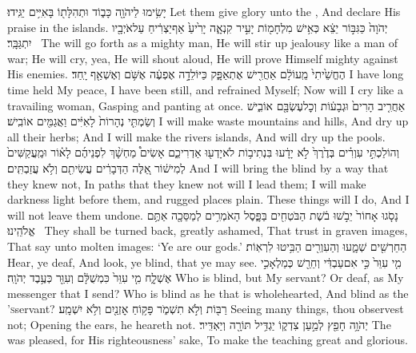 {יָשִׂ֥ימוּ לַיהֹוָ֖ה כָּב֑וֹד וּתְהִלָּת֖וֹ בָּאִיִּ֥ים יַגִּֽידוּ׃}
{Let them give glory unto the \lord, And declare His praise in the islands.}
{יְהֹוָה֙ כַּגִּבּ֣וֹר יֵצֵ֔א כְּאִ֥ישׁ מִלְחָמ֖וֹת יָעִ֣יר קִנְאָ֑ה יָרִ֙יעַ֙ אַף\maqqaf יַצְרִ֔יחַ עַל\maqqaf אֹיְבָ֖יו יִתְגַּבָּֽר׃ \setuma }
{The \lord\space will go forth as a mighty man, He will stir up jealousy like a man of war; He will cry, yea, He will shout aloud, He will prove Himself mighty against His enemies.}
{הֶחֱשֵׁ֙יתִי֙ מֵֽעוֹלָ֔ם אַחֲרִ֖ישׁ אֶתְאַפָּ֑ק כַּיּוֹלֵדָ֣ה אֶפְעֶ֔ה אֶשֹּׁ֥ם וְאֶשְׁאַ֖ף יָֽחַד׃}
{I have long time held My peace, I have been still, and refrained Myself; Now will I cry like a travailing woman, Gasping and panting at once.}
{אַחֲרִ֤יב הָרִים֙ וּגְבָע֔וֹת וְכׇל\maqqaf עֶשְׂבָּ֖ם אוֹבִ֑ישׁ וְשַׂמְתִּ֤י נְהָרוֹת֙ לָאִיִּ֔ים וַאֲגַמִּ֖ים אוֹבִֽישׁ׃}
{I will make waste mountains and hills, And dry up all their herbs; And I will make the rivers islands, And will dry up the pools.}
{וְהוֹלַכְתִּ֣י עִוְרִ֗ים בְּדֶ֙רֶךְ֙ לֹ֣א יָדָ֔עוּ בִּנְתִיב֥וֹת לֹא\maqqaf יָדְע֖וּ אַדְרִיכֵ֑ם אָשִׂים֩ מַחְשָׁ֨ךְ לִפְנֵיהֶ֜ם לָא֗וֹר וּמַֽעֲקַשִּׁים֙ לְמִישׁ֔וֹר אֵ֚לֶּה הַדְּבָרִ֔ים עֲשִׂיתִ֖ם וְלֹ֥א עֲזַבְתִּֽים׃}
{And I will bring the blind by a way that they knew not, In paths that they knew not will I lead them; I will make darkness light before them, and rugged places plain. These things will I do, And I will not leave them undone.}
{נָסֹ֤גוּ אָחוֹר֙ יֵבֹ֣שׁוּ בֹ֔שֶׁת הַבֹּטְחִ֖ים בַּפָּ֑סֶל הָאֹמְרִ֥ים לְמַסֵּכָ֖ה אַתֶּ֥ם אֱלֹהֵֽינוּ׃ \petucha }
{They shall be turned back, greatly ashamed, That trust in graven images, That say unto molten images: ‘Ye are our gods.’}
{הַחֵרְשִׁ֖ים שְׁמָ֑עוּ וְהַעִוְרִ֖ים הַבִּ֥יטוּ לִרְאֽוֹת׃}
{Hear, ye deaf, And look, ye blind, that ye may see.}
{מִ֤י עִוֵּר֙ כִּ֣י אִם\maqqaf עַבְדִּ֔י וְחֵרֵ֖שׁ כְּמַלְאָכִ֣י אֶשְׁלָ֑ח מִ֤י עִוֵּר֙ כִּמְשֻׁלָּ֔ם וְעִוֵּ֖ר כְּעֶ֥בֶד יְהֹוָֽה׃}
{Who is blind, but My servant? Or deaf, as My messenger that I send? Who is blind as he that is wholehearted, And blind as the \lord\textsc{’s}\space servant?}
{ רַבּ֖וֹת וְלֹ֣א תִשְׁמֹ֑ר פָּק֥וֹחַ אׇזְנַ֖יִם וְלֹ֥א יִשְׁמָֽע׃}
{Seeing many things, thou observest not; Opening the ears, he heareth not.}
{יְהֹוָ֥ה חָפֵ֖ץ לְמַ֣עַן צִדְק֑וֹ יַגְדִּ֥יל תּוֹרָ֖ה וְיַאְדִּֽיר׃}
{The \lord\space was pleased, for His righteousness’ sake, To make the teaching great and glorious.}
